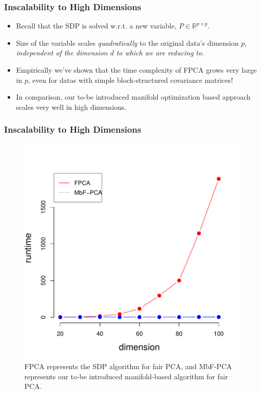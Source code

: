 \documentclass{beamer}
\begin{document}
\begin{frame}
	\frametitle{Inscalability to High Dimensions}
	\begin{itemize}
		\item Recall that the SDP is solved w.r.t. a new variable, $P \in \mathbb{R}^{p \times p}$.
		
		\item Size of the variable scales {\it quadratically} to the original data's dimension $p$, {\it independent of the dimension $d$ to which we are reducing to}.
		
		\item Empirically we've shown that the time complexity of FPCA grows very large in $p$, even for datas with simple block-structured covariance matrices!
		
		\item In comparison, our to-be introduced manifold optimization based approach scales very well in high dimensions.
	\end{itemize}
\end{frame}

\begin{frame}
	\frametitle{Inscalability to High Dimensions}
	\begin{figure}
		\centering
		\includegraphics[width=0.5\linewidth]{figures/exp1-2/runtime.pdf}
		\caption{FPCA represents the SDP algorithm for fair PCA, and MbF-PCA represents our to-be introduced manifold-based algorithm for fair PCA. \cite{Lee21}}
		\label{fig:runtime}
	\end{figure}
\end{frame}
\end{document}
